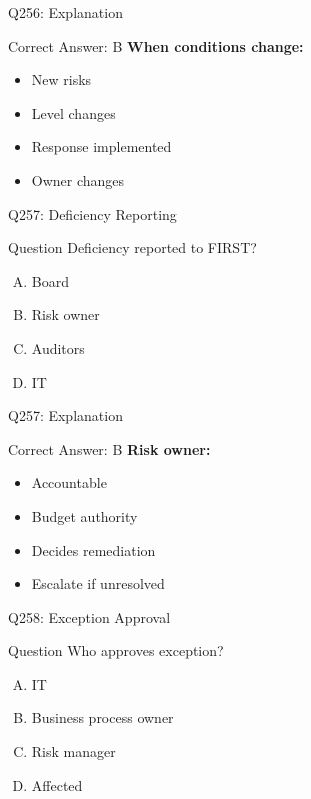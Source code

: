 \documentclass{beamer}
\begin{document}
	\begin{frame}{Q256: Explanation}
		\begin{block}{Correct Answer: B}
			\textbf{When conditions change:}
			\begin{itemize}
				\item New risks
				\item Level changes
				\item Response implemented
				\item Owner changes
			\end{itemize}
		\end{block}
	\end{frame}
	
	\begin{frame}{Q257: Deficiency Reporting}
		\begin{block}{Question}
			Deficiency reported to FIRST?
		\end{block}
		\begin{enumerate}[(A)]
			\item Board
			\item Risk owner
			\item Auditors
			\item IT
		\end{enumerate}
	\end{frame}
	
	\begin{frame}{Q257: Explanation}
		\begin{block}{Correct Answer: B}
			\textbf{Risk owner:}
			\begin{itemize}
				\item Accountable
				\item Budget authority
				\item Decides remediation
				\item Escalate if unresolved
			\end{itemize}
		\end{block}
	\end{frame}
	
	\begin{frame}{Q258: Exception Approval}
		\begin{block}{Question}
			Who approves exception?
		\end{block}
		\begin{enumerate}[(A)]
			\item IT
			\item Business process owner
			\item Risk manager
			\item Affected
		\end{enumerate}
	\end{frame}
	
\end{document}
